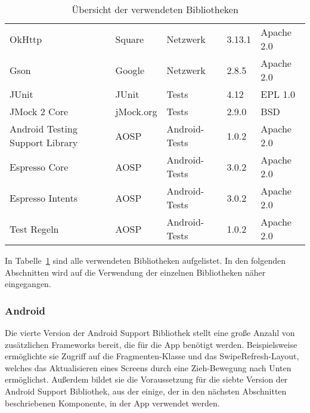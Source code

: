 \begin{table}[h]
\begin{tabularx}{\textwidth}{|X|l|l|l|l|}
        OkHttp & Square & Netzwerk & 3.13.1 & Apache 2.0\\   %
        Gson & Google & Netzwerk & 2.8.5 & Apache 2.0\\   %
        \hline

        JUnit & JUnit & Tests & 4.12 & EPL 1.0\\   %
        JMock 2 Core & jMock.org & Tests & 2.9.0 & BSD\\    %
        \hline

        Android Testing Support Library & AOSP & Android-Tests & 1.0.2 & Apache 2.0\\   %
        Espresso Core & AOSP & Android-Tests & 3.0.2 & Apache 2.0\\    %
        Espresso Intents & AOSP & Android-Tests & 3.0.2 & Apache 2.0\\ %
        Test Regeln & AOSP & Android-Tests & 1.0.2 & Apache 2.0\\  %
        \hline
    \end{tabularx}

    \caption{Übersicht der verwendeten Bibliotheken}
    \label{tab:libraries}
\end{table}

In Tabelle~\ref{tab:libraries} sind alle verwendeten Bibliotheken aufgelistet.
In den folgenden Abschnitten wird auf die Verwendung der einzelnen Bibliotheken näher eingegangen.

\subsubsection{Android} \label{subsubsec:android-libraries}
Die vierte Version der Android Support Bibliothek stellt eine große Anzahl von zusätzlichen Frameworks bereit, die für die App benötigt werden.
Beispielsweise ermöglichte sie Zugriff auf die Fragmenten-Klasse und das SwipeRefresh-Layout, welches das Aktualisieren eines Screens durch eine Zieh-Bewegung nach Unten ermöglichst.
Außerdem bildet sie die Voraussetzung für die siebte Version der Android Support Bibliothek, aus der einige, der in den nächsten Abschnitten beschriebenen Komponente, in der App verwendet werden.

